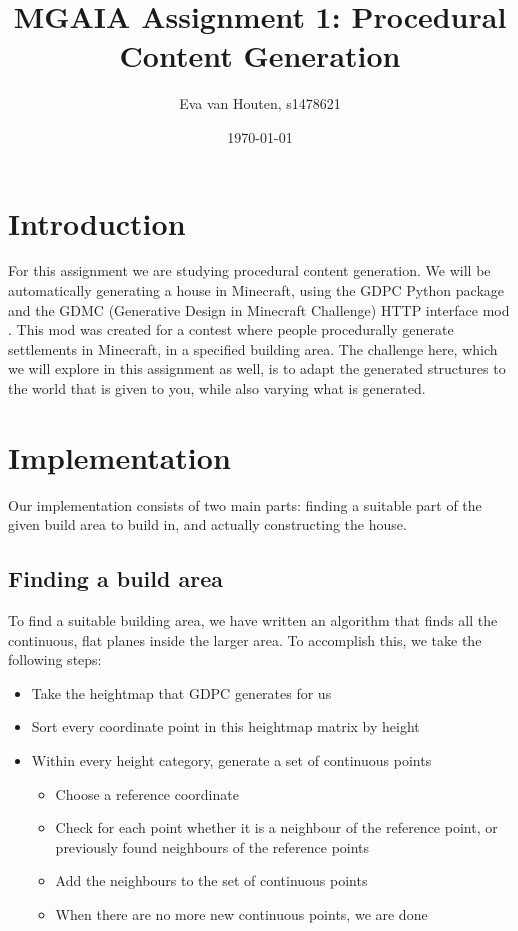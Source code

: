 \documentclass[10pt]{article}
\title{MGAIA Assignment 1: Procedural Content Generation}
\date{\today}
\author{Eva van Houten, s1478621}
\begin{document}
\maketitle

\section{Introduction}
For this assignment we are studying procedural content generation. We will be automatically generating a house in Minecraft, using the GDPC Python package \cite{GDPC} and the GDMC (Generative Design in Minecraft Challenge) \cite{GDMC} HTTP interface mod \cite{mod}. This mod was created for a contest where people procedurally generate settlements in Minecraft, in a specified building area. The challenge here, which we will explore in this assignment as well, is to adapt the generated structures to the world that is given to you, while also varying what is generated. %

\section{Implementation}
Our implementation consists of two main parts: finding a suitable part of the given build area to build in, and actually constructing the house.
\subsection{Finding a build area}
To find a suitable building area, we have written an algorithm that finds all the continuous, flat planes inside the larger area. To accomplish this, we take the following steps:
\begin{itemize}
    \item Take the heightmap that GDPC generates for us
    \item Sort every coordinate point in this heightmap matrix by height
    \item Within every height category, generate a set of continuous points
          \begin{itemize}
              \item Choose a reference coordinate
              \item Check for each point whether it is a neighbour of the reference point, or previously found neighbours of the reference points
              \item Add the neighbours to the set of continuous points
              \item When there are no more new continuous points, we are done
          \end{itemize}
\end{itemize}
\end{document}
